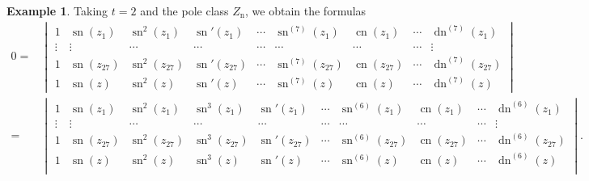 \documentclass{amsart}
\theoremstyle{definition}
\newtheorem{example}[theorem]{Example}
\DeclareMathOperator{\dn}{dn}
\DeclareMathOperator{\sn}{sn}
\DeclareMathOperator{\cn}{cn}
\DeclareMathOperator{\n}{n}
\begin{document}
\begin{example}
    Taking $t=2$ and the pole class $Z_{\n}$, we obtain the formulas
    \begin{align*}
        0=&\begin{vmatrix}
1&\sn(z_1) &  \sn^{2}(z_1) & \sn'(z_1) & \cdots & \sn^{(7)}(z_1) & \cn(z_1)&\cdots &   \dn^{(7)}(z_1) \\
 \vdots&\vdots & \cdots & \cdots &  \cdots & \cdots & \cdots &\cdots & \vdots \\
1&\sn(z_{27}) &  \sn^{2}(z_{27}) & \sn'(z_{27}) & \cdots & \sn^{(7)}(z_{27}) & \cn(z_{27})&\cdots &   \dn^{(7)}(z_{27}) \\
1&\sn(z) &  \sn^{2}(z) & \sn'(z) & \cdots & \sn^{(7)}(z)&\cn(z) & \cdots &   \dn^{(7)}(z) 
\end{vmatrix}\\
=&\begin{vmatrix}
1&\sn(z_1) & \sn^2(z_1) & \sn^{3}(z_1) & \sn'(z_1) & \cdots & \sn^{(6)}(z_1) &\cn(z_1) & \cdots &   \dn^{(6)}(z_1) \\
 \vdots&\vdots & \cdots & \cdots &  \cdots & \cdots & \cdots & \cdots & \cdots & \vdots \\
1&\sn(z_{27}) & \sn^2(z_{27}) & \sn^{3}(z_{27}) & \sn'(z_{27}) & \cdots & \sn^{(6)}(z_{27}) &\cn(z_{27}) & \cdots &   \dn^{(6)}(z_{27}) \\
1&\sn(z) & \sn^2(z) & \sn^{3}(z) & \sn'(z) & \cdots & \sn^{(6)}(z) &\cn(z) & \cdots &   \dn^{(6)}(z) \\
\end{vmatrix}.
    \end{align*}
\end{example}
\end{document}
